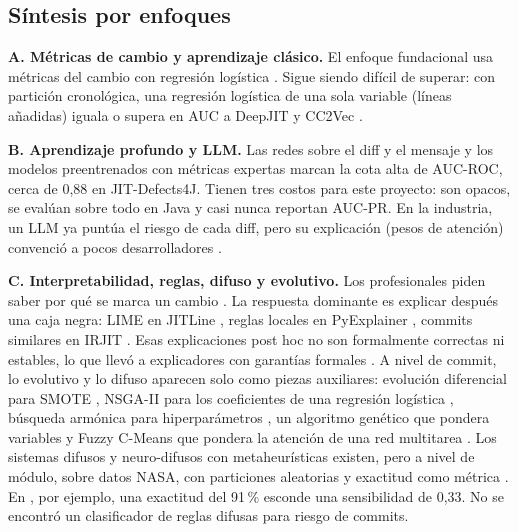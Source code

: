 \documentclass[conference,letterpaper]{IEEEtran}
\begin{document}
\subsection{Síntesis por enfoques}

\textbf{A. Métricas de cambio y aprendizaje clásico.} El enfoque fundacional usa métricas del cambio con regresión logística \cite{Mockus2000,Kamei2013}. Sigue siendo difícil de superar: con partición cronológica, una regresión logística de una sola variable (líneas añadidas) iguala o supera en AUC a DeepJIT y CC2Vec \cite{Zeng2021}.

\textbf{B. Aprendizaje profundo y LLM.} Las redes sobre el diff y el mensaje y los modelos preentrenados con métricas expertas \cite{Ni2022} marcan la cota alta de AUC-ROC, cerca de 0,88 en JIT-Defects4J. Tienen tres costos para este proyecto: son opacos, se evalúan sobre todo en Java y casi nunca reportan AUC-PR. En la industria, un LLM ya puntúa el riesgo de cada diff, pero su explicación (pesos de atención) convenció a pocos desarrolladores \cite{Liu2026}.

\textbf{C. Interpretabilidad, reglas, difuso y evolutivo.} Los profesionales piden saber por qué se marca un cambio \cite{Jiarpakdee2021}. La respuesta dominante es explicar después una caja negra: LIME en JITLine \cite{JITLine2021}, reglas locales en PyExplainer \cite{PyExplainer2021}, commits similares en IRJIT \cite{Sahar2024}. Esas explicaciones post hoc no son formalmente correctas ni estables, lo que llevó a explicadores con garantías formales \cite{Yu2024FoX}. A nivel de commit, lo evolutivo y lo difuso aparecen solo como piezas auxiliares: evolución diferencial para SMOTE \cite{JITLine2021}, NSGA-II para los coeficientes de una regresión logística \cite{Chen2018MULTI}, búsqueda armónica para hiperparámetros \cite{Kang2021}, un algoritmo genético que pondera variables \cite{Mostafa2025} y Fuzzy C-Means que pondera la atención de una red multitarea \cite{Chen2025}. Los sistemas difusos y neuro-difusos con metaheurísticas existen, pero a nivel de módulo, sobre datos NASA, con particiones aleatorias y exactitud como métrica \cite{Aftab2023,Dey2025}. En \cite{Aftab2023}, por ejemplo, una exactitud del 91\,\% esconde una sensibilidad de 0,33. No se encontró un clasificador de reglas difusas para riesgo de commits.
\end{document}
